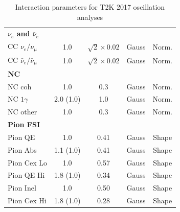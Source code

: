 \begin{table}
\begin{tabular}{l | c c c c }
		\hline
		\textbf{$\nu_e$ and $\bar{\nu}_e$} & & & & \\
		CC $\nu_e/\nu_\mu$ & 1.0 & $\sqrt{2}\times0.02$ & Gauss & Norm. \\
		CC $\bar{\nu}_e/\bar{\nu}_\mu$ & 1.0 & $\sqrt{2}\times0.02$ & Gauss & Norm. \\
		\hline
		\textbf{NC} & & & & \\
		NC coh & 1.0 & 0.3 & Gauss & Norm. \\
		NC $1\gamma$ & 2.0 (1.0) & 1.0 & Gauss & Norm. \\
		NC other & 1.0 & 0.3 & Gauss & Norm. \\
		\hline
		\textbf{Pion FSI} & & & & \\
		Pion QE & 1.0 & 0.41 & Gauss & Shape \\
		Pion Abs & 1.1 (1.0) & 0.41 & Gauss & Shape \\
		Pion Cex Lo & 1.0 & 0.57 & Gauss & Shape \\
		Pion QE Hi & 1.8 (1.0) & 0.34 & Gauss & Shape \\
		Pion Inel & 1.0 & 0.50 & Gauss & Shape \\
		Pion Cex Hi & 1.8 (1.0) & 0.28 & Gauss & Shape \\
		\hline
		\hline
	\end{tabular}
\caption{Interaction parameters for T2K 2017 oscillation analyses}
\label{tab:xsec_params}
\end{table}